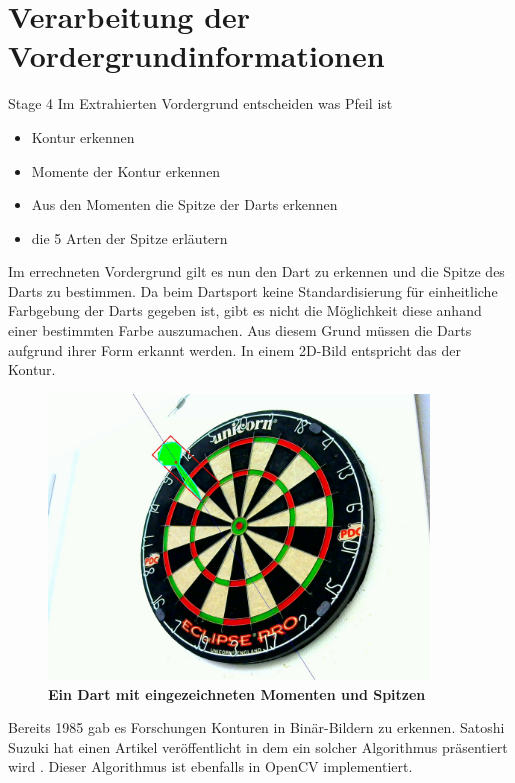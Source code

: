 \section{Verarbeitung der Vordergrundinformationen}
\label{sec:foreground}
Stage 4 Im Extrahierten Vordergrund entscheiden was Pfeil ist
\begin{itemize}
\item Kontur erkennen
\item Momente der Kontur erkennen
\item Aus den Momenten die Spitze der Darts erkennen
\item die 5 Arten der Spitze erläutern
\end{itemize}
Im errechneten Vordergrund gilt es nun den Dart zu erkennen und die Spitze des Darts zu bestimmen. Da beim Dartsport keine Standardisierung für einheitliche Farbgebung der Darts gegeben ist, gibt es nicht die Möglichkeit diese anhand einer bestimmten Farbe auszumachen. Aus diesem Grund müssen die Darts aufgrund ihrer Form erkannt werden. In einem 2D-Bild entspricht das der Kontur.
\begin{figure}[ht]
\centering
\includegraphics[width=0.9\textwidth]{media/backgroundfeature}
\caption{\textbf{Ein Dart mit eingezeichneten Momenten und Spitzen}}
\label{Fig:detecteddart}
\end{figure}
Bereits 1985 gab es Forschungen Konturen in Binär-Bildern zu erkennen. Satoshi Suzuki hat einen Artikel veröffentlicht in dem ein solcher Algorithmus präsentiert wird \autocite{contour1985}. Dieser Algorithmus ist ebenfalls in OpenCV implementiert. 

